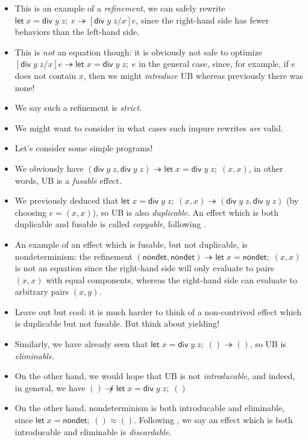 \documentclass[acmsmall,screen,review]{acmart}
\newcommand{\ms}[1]{\ensuremath{\mathsf{#1}}}
\newcommand{\letexpr}[3]{\ensuremath{\ms{let}\;#1 = #2;\;#3}}
\newcommand{\teqv}{\approx}
\newcommand{\tref}{\twoheadrightarrow}
\begin{document}
\begin{itemize}
  \item This is an example of a \emph{refinement}, we can safely rewrite
  $\letexpr{x}{\ms{div}\;y\;z}{e} \tref [\ms{div}\;y\;z/x]e$, since the right-hand side has fewer
  behaviors than the left-hand side.
  \item This is \emph{not} an equation though: it is obviously not safe to optimize
  $[\ms{div}\;y\;z/x]e \tref \letexpr{x}{\ms{div}\;y\;z}{e}$ in the general case, since, for example,
  if $e$ does not contain $x$, then we might \emph{introduce} UB whereas previously there was none!
  \item We say such a refinement is \emph{strict}.
  \item We might want to consider in what cases such impure rewrites \emph{are} valid.
  \item Let's consider some simple programs!
  \item We obviously have $(\ms{div}\;y\;z, \ms{div}\;y\;z) \tref \letexpr{x}{\ms{div}\;y\;z}{(x,
  x)}$, in other words, UB is a \emph{fusable} effect.
  \item We previously deduced that $\letexpr{x}{\ms{div}\;y\;z}{(x, x)} \tref (\ms{div}\;y\;z,
  \ms{div}\;y\;z)$ (by choosing $e = (x, x)$), so UB is also \emph{duplicable}. An effect which is
  both duplicable and fusable is called \emph{copyable}, following \citet{fuhrmann-direct-1999}.
  \item An example of an effect which is fusable, but not duplicable, is nondeterminism: the
  refinement $(\ms{nondet}, \ms{nondet}) \tref \letexpr{x}{\ms{nondet}}{(x, x)}$ is not an equation
  since the right-hand side will only evaluate to pairs $(x, x)$ with equal components, whereas the
  right-hand side can evaluate to arbitrary pairs $(x, y)$.
  \item Leave out but cool: it is much harder to think of a non-contrived effect which is duplicable
  but not fusable. But think about yielding!
  \item Similarly, we have already seen that $\letexpr{x}{\ms{div}\;y\;z}{()} \tref ()$, so UB is
  \emph{eliminable}.
  \item On the other hand, we would hope that UB is not \emph{introducable}, and indeed, in general,
  we have $() \not\tref \letexpr{x}{\ms{div}\;y\;z}{()}$
  \item On the other hand, nondeterminism is both introducable and eliminable, since
  $\letexpr{x}{\ms{nondet}}{()} \teqv ()$. Following \citet{fuhrmann-direct-1999}, we say an effect
  which is both introducable and eliminable is \emph{discardable}.

\end{itemize}
\end{document}

